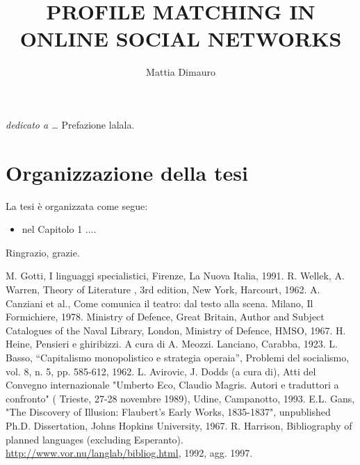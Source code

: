 \documentclass[12pt]{report}
\begin{document}
\title{PROFILE MATCHING IN ONLINE SOCIAL NETWORKS}
\author{Mattia Dimauro}
%
%
%
\beforepreface
\prefacesection{}
        {\hfill \Large {\sl dedicato a \dots}}
%
%
Prefazione lalala.
%
%
\section*{Organizzazione della tesi}
\label{organizzazione}
La tesi \`e organizzata come segue:
\begin{itemize}
\item nel Capitolo 1 ....
\end{itemize}
%
%
Ringrazio, grazie.
\afterpreface
%
%

%
%

%
%

%
%


%
%
\begin{thebibliography}{00}
%
M. Gotti, I linguaggi specialistici, Firenze, La Nuova Italia, 1991.
%
R. Wellek, A. Warren, Theory of Literature , 3rd edition, New York, Harcourt, 1962.
%
A. Canziani et al., Come comunica il teatro: dal testo alla scena. Milano, Il Formichiere, 1978.
%
Ministry of Defence, Great Britain, Author and Subject Catalogues of the Naval Library, London, Ministry of Defence, HMSO, 1967.
%
H. Heine, Pensieri e ghiribizzi. A cura di A. Meozzi. Lanciano, Carabba, 1923.
%
L. Basso, ``Capitalismo monopolistico e strategia operaia'', Problemi del socialismo, vol. 8, n. 5, pp. 585-612, 1962.
%
L. Avirovic, J. Dodds (a cura di), Atti del Convegno internazionale "Umberto Eco, Claudio Magris. Autori e traduttori a confronto" ( Trieste, 27-28 novembre 1989), Udine, Campanotto, 1993.
%
E.L. Gans, "The Discovery of Illusion: Flaubert's Early Works, 1835-1837", unpublished Ph.D. Dissertation, Johns Hopkins University, 1967.
%
R. Harrison, Bibliography of planned languages (excluding Esperanto).  \url{http://www.vor.nu/langlab/bibliog.html}, 1992, agg. 1997.
%
\end{thebibliography}
%
\end{document}
